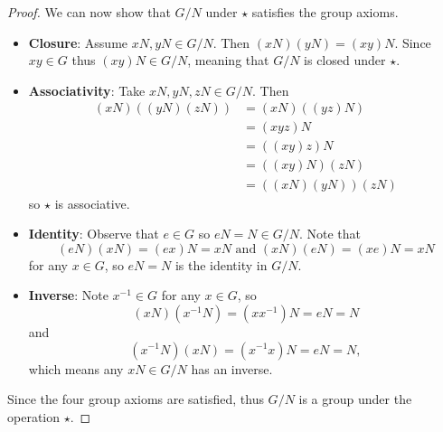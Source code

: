 \begin{proof}
    We can now show that $G/N$ under $\star$ satisfies the group axioms.
    \begin{itemize}
        \item \textbf{Closure}: Assume $xN, yN \in G/N$. Then $(xN)(yN) = (xy)N$. Since $xy \in G$ thus $(xy)N \in G/N$, meaning that $G/N$ is closed under $\star$.
        \item \textbf{Associativity}: Take $xN, yN, zN \in G/N$. Then
        \begin{align*}
            (xN)\left((yN)(zN)\right) &= (xN)\left((yz)N\right)\\
            &= (xyz)N\\
            &= \left((xy)z\right)N\\
            &= \left((xy)N\right)(zN)\\
            &= \left((xN)(yN)\right)(zN)
        \end{align*}
        so $\star$ is associative.
        \item \textbf{Identity}: Observe that $e \in G$ so $eN = N \in G / N$. Note that
        \[
        (eN)(xN) = (ex)N = xN \text{ and } (xN)(eN) = (xe)N = xN
        \]
        for any $x \in G$, so $eN = N$ is the identity in $G/N$.
        \item \textbf{Inverse}: Note $x^{-1} \in G$ for any $x \in G$, so
        \[
            (xN)(x^{-1}N) = (xx^{-1})N = eN = N
        \]
        and
        \[
            (x^{-1}N)(xN) = (x^{-1}x)N = eN = N,
        \]
        which means any $xN \in G/N$ has an inverse.
    \end{itemize}
    Since the four group axioms are satisfied, thus $G/N$ is a group under the operation $\star$.
\end{proof}

